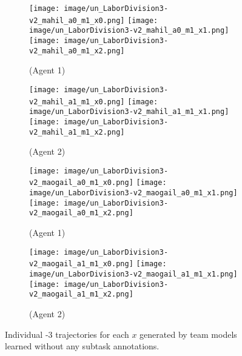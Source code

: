 \begin{figure}[h]
  \def\subfwid{.48}
  \def\figwid{.3}
  \centering
  \begin{subfigure}[t]{\subfwid\linewidth}
      \centering
      \texttt{[image: image/un\_LaborDivision3-v2\_mahil\_a0\_m1\_x0.png]}\hspace{0.5ex}
      \texttt{[image: image/un\_LaborDivision3-v2\_mahil\_a0\_m1\_x1.png]}\hspace{0.5ex}
      \texttt{[image: image/un\_LaborDivision3-v2\_mahil\_a0\_m1\_x2.png]}
      \caption{\ouralg (Agent 1)}
      \label{fig: unsupervised DTIL a1}
  \end{subfigure}
  \hspace{1ex}
  \begin{subfigure}[t]{\subfwid\linewidth}
      \centering
      \texttt{[image: image/un\_LaborDivision3-v2\_mahil\_a1\_m1\_x0.png]}\hspace{0.5ex}
      \texttt{[image: image/un\_LaborDivision3-v2\_mahil\_a1\_m1\_x1.png]}\hspace{0.5ex}
      \texttt{[image: image/un\_LaborDivision3-v2\_mahil\_a1\_m1\_x2.png]}
      \caption{\ouralg (Agent 2)}
  \end{subfigure}
  \begin{subfigure}[t]{\subfwid\linewidth}
      \centering
      \texttt{[image: image/un\_LaborDivision3-v2\_maogail\_a0\_m1\_x0.png]}\hspace{0.5ex}
      \texttt{[image: image/un\_LaborDivision3-v2\_maogail\_a0\_m1\_x1.png]}\hspace{0.5ex}
      \texttt{[image: image/un\_LaborDivision3-v2\_maogail\_a0\_m1\_x2.png]}
      \caption{\maogail (Agent 1)}
  \end{subfigure}
  \hspace{1ex}
  \begin{subfigure}[t]{\subfwid\linewidth}
      \centering
      \texttt{[image: image/un\_LaborDivision3-v2\_maogail\_a1\_m1\_x0.png]}\hspace{0.5ex}
      \texttt{[image: image/un\_LaborDivision3-v2\_maogail\_a1\_m1\_x1.png]}\hspace{0.5ex}
      \texttt{[image: image/un\_LaborDivision3-v2\_maogail\_a1\_m1\_x2.png]}
      \caption{\maogail (Agent 2)}
  \end{subfigure}
  \captionsetup{subrefformat=parens}
  \caption{Individual \simplemulti-$3$ trajectories for each $x$ generated by team models learned without any subtask annotations.}
  \label{fig: unsupervised paths}
\end{figure}


